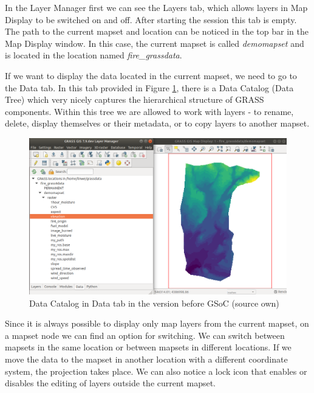 \documentclass[a4paper,10pt,twoside]{article}
\begin{document}
In the Layer Manager first we can see the Layers tab, which allows layers in Map Display to be switched on and off. After starting the session this tab is empty. The path to the current mapset and location can be noticed in the top bar in the Map Display window. In this case, the current mapset is called \textit{demomapset} and is located in the location named \textit{fire\_grassdata}. 

If we want to display the data located in the current mapset, we need to go to the Data tab. In this tab provided in Figure \ref{fig:data_catalog_pred}, there is a Data Catalog (Data Tree) which very nicely captures the hierarchical structure of GRASS components. Within this tree we are allowed to work with layers - to rename, delete, display themselves or their metadata, or to copy layers to another mapset.

\vspace{0.3cm}
\begin{figure}[hbt!] 
\begin{center}
\includegraphics[width=14cm]{pictures/data_catalog_pred.png} 
\caption[Data Catalog in Data tab (version before GSoC)]{Data Catalog in Data tab in the version before GSoC (source own)}
\label{fig:data_catalog_pred}
\end{center}
\end{figure}

Since it is always possible to display only map layers from the current mapset, on a mapset node we can find an option for switching. We can switch between mapsets in the same location or between mapsets in different locations. If we move the data to the mapset in another location with a different coordinate system, the projection takes place. We can also notice a lock icon that enables or disables the editing of layers outside the current mapset. 
\end{document}
